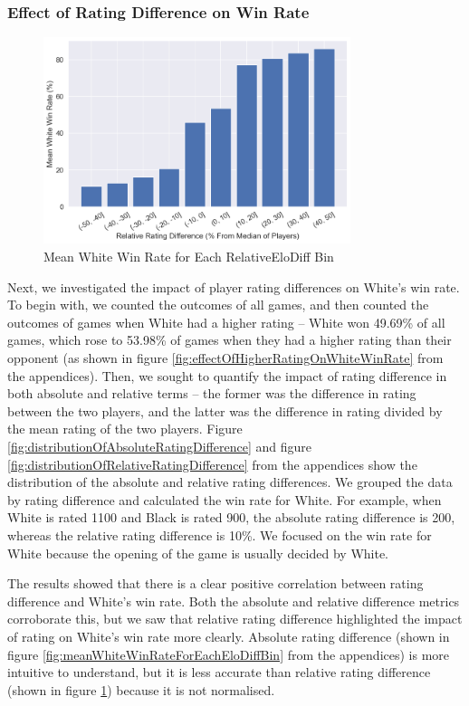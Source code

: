 \documentclass[a4paper, 11pt]{article}
\begin{document}
\subsubsection{Effect of Rating Difference on Win Rate}

\begin{figure}[H]
    \centering
    \caption{Mean White Win Rate for Each RelativeEloDiff Bin}
    \label{fig:meanWhiteWinRateForEachRelativeEloDiffBin}
    \includegraphics[width=0.8\textwidth]{Mean White Win Rate for Each RelativeEloDiff Bin.png}
\end{figure}

Next, we investigated the impact of player rating differences on White's win rate. To begin with, we counted the outcomes of all games, and then counted the outcomes of games when White had a higher rating -- White won 49.69\% of all games, which rose to 53.98\% of games when they had a higher rating than their opponent (as shown in figure \ref{fig:effectOfHigherRatingOnWhiteWinRate} from the appendices). Then, we sought to quantify the impact of rating difference in both absolute and relative terms -- the former was the difference in rating between the two players, and the latter was the difference in rating divided by the mean rating of the two players. Figure \ref{fig:distributionOfAbsoluteRatingDifference} and figure \ref{fig:distributionOfRelativeRatingDifference} from the appendices show the distribution of the absolute and relative rating differences. We grouped the data by rating difference and calculated the win rate for White. For example, when White is rated 1100 and Black is rated 900, the absolute rating difference is 200, whereas the relative rating difference is 10\%. We focused on the win rate for White because the opening of the game is usually decided by White.

The results showed that there is a clear positive correlation between rating difference and White's win rate. Both the absolute and relative difference metrics corroborate this, but we saw that relative rating difference highlighted the impact of rating on White's win rate more clearly. Absolute rating difference (shown in figure \ref{fig:meanWhiteWinRateForEachEloDiffBin} from the appendices) is more intuitive to understand, but it is less accurate than relative rating difference (shown in figure \ref{fig:meanWhiteWinRateForEachRelativeEloDiffBin}) because it is not normalised.
\end{document}
